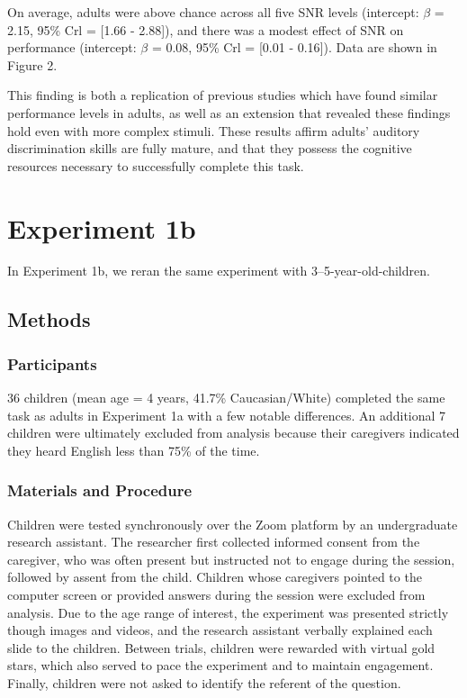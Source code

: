 \documentclass[10pt, letterpaper]{article}
\begin{document}
On average, adults were above chance across all five SNR levels
(intercept: \(\beta\) = 2.15, 95\% Crl = {[}1.66 - 2.88{]}), and there
was a modest effect of SNR on performance (intercept: \(\beta\) = 0.08,
95\% Crl = {[}0.01 - 0.16{]}). Data are shown in Figure 2.

This finding is both a replication of previous studies which have found
similar performance levels in adults, as well as an extension that
revealed these findings hold even with more complex stimuli. These
results affirm adults' auditory discrimination skills are fully mature,
and that they possess the cognitive resources necessary to successfully
complete this task.

\hypertarget{experiment-1b}{%
\section{Experiment 1b}\label{experiment-1b}}

In Experiment 1b, we reran the same experiment with
3--5-year-old-children.

\hypertarget{methods-1}{%
\subsection{Methods}\label{methods-1}}

\hypertarget{participants-1}{%
\subsubsection{Participants}\label{participants-1}}

36 children (mean age = 4 years, 41.7\% Caucasian/White) completed the
same task as adults in Experiment 1a with a few notable differences. An
additional 7 children were ultimately excluded from analysis because
their caregivers indicated they heard English less than 75\% of the
time.

\hypertarget{materials-and-procedure-1}{%
\subsubsection{Materials and
Procedure}\label{materials-and-procedure-1}}

Children were tested synchronously over the Zoom platform by an
undergraduate research assistant. The researcher first collected
informed consent from the caregiver, who was often present but
instructed not to engage during the session, followed by assent from the
child. Children whose caregivers pointed to the computer screen or
provided answers during the session were excluded from analysis. Due to
the age range of interest, the experiment was presented strictly though
images and videos, and the research assistant verbally explained each
slide to the children. Between trials, children were rewarded with
virtual gold stars, which also served to pace the experiment and to
maintain engagement. Finally, children were not asked to identify the
referent of the question.
\end{document}

